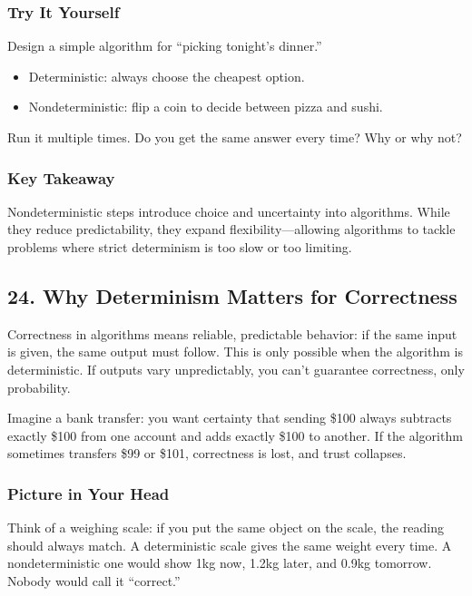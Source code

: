 \documentclass[
  letterpaper,
  DIV=11,
  numbers=noendperiod]{scrreprt}
\providecommand{\tightlist}{%
  \setlength{\itemsep}{0pt}\setlength{\parskip}{0pt}}
\begin{document}
\subsubsection{Try It Yourself}\label{try-it-yourself-22}

Design a simple algorithm for ``picking tonight's dinner.''

\begin{itemize}
\tightlist
\item
  Deterministic: always choose the cheapest option.
\item
  Nondeterministic: flip a coin to decide between pizza and sushi.
\end{itemize}

Run it multiple times. Do you get the same answer every time? Why or why
not?

\subsubsection{Key Takeaway}\label{key-takeaway-21}

Nondeterministic steps introduce choice and uncertainty into algorithms.
While they reduce predictability, they expand flexibility---allowing
algorithms to tackle problems where strict determinism is too slow or
too limiting.

\subsection{24. Why Determinism Matters for
Correctness}\label{why-determinism-matters-for-correctness}

Correctness in algorithms means reliable, predictable behavior: if the
same input is given, the same output must follow. This is only possible
when the algorithm is deterministic. If outputs vary unpredictably, you
can't guarantee correctness, only probability.

Imagine a bank transfer: you want certainty that sending \$100 always
subtracts exactly \$100 from one account and adds exactly \$100 to
another. If the algorithm sometimes transfers \$99 or \$101, correctness
is lost, and trust collapses.

\subsubsection{Picture in Your Head}\label{picture-in-your-head-23}

Think of a weighing scale: if you put the same object on the scale, the
reading should always match. A deterministic scale gives the same weight
every time. A nondeterministic one would show 1kg now, 1.2kg later, and
0.9kg tomorrow. Nobody would call it ``correct.''
\end{document}
